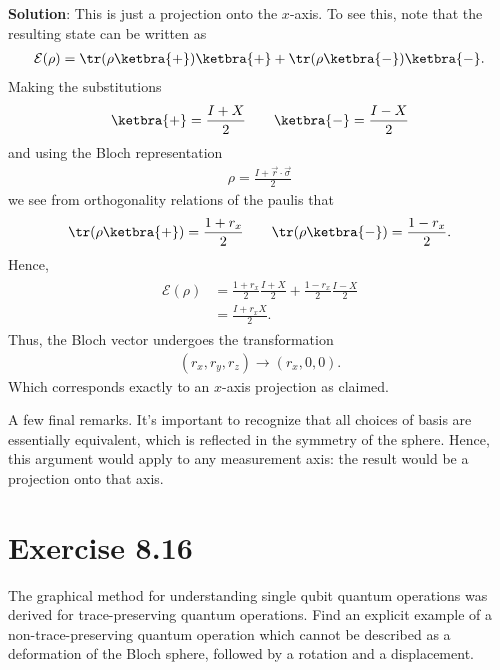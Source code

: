 \documentclass{book}
\begin{document}
    \textbf{Solution}: This is just a projection onto the $x$-axis. To see this, note that the resulting state can be written as
    \begin{align}
        \mathcal{E}(\rho) = \tr(\rho \ketbra{+}) \ketbra{+} + \tr(\rho \ketbra{-}) \ketbra{-}.
    \end{align}
    Making the substitutions
    \begin{align}
        \ketbra{+} = \frac{I + X}{2} \qquad \ketbra{-} = \frac{I - X}{2}
    \end{align}
    and using the Bloch representation
    \begin{align}
        \rho = \frac{I + \vec{r} \cdot \vec{\sigma}}{2}
    \end{align}
    we see from orthogonality relations of the paulis that
    \begin{align}
        \tr(\rho \ketbra{+}) = \frac{1 + r_x}{2} \qquad \tr(\rho \ketbra{-}) = \frac{1-r_x}{2}.
    \end{align}
    Hence,
    \begin{align}
    \begin{aligned}
        \mathcal{E}(\rho) &= \frac{1 + r_x}{2} \frac{I + X}{2} + \frac{1 - r_x}{2} \frac{I - X}{2} \\
        &= \frac{I + r_x X}{2}.
    \end{aligned}
    \end{align}
    Thus, the Bloch vector undergoes the transformation
    \begin{align}
        (r_x, r_y, r_z) \rightarrow (r_x, 0,0).
    \end{align}
    Which corresponds exactly to an $x$-axis projection as claimed.

    A few final remarks. It's important to recognize that all choices of basis are essentially equivalent, which is reflected in the symmetry of the sphere. Hence, this argument would apply to any measurement axis: the result would be a projection onto that axis. 

\section*{Exercise 8.16}
    The graphical method for understanding single qubit quantum operations was derived for trace-preserving quantum operations. Find an explicit example of a non-trace-preserving quantum operation which cannot be described as a deformation of the Bloch sphere, followed by a rotation and a displacement.
\end{document}
